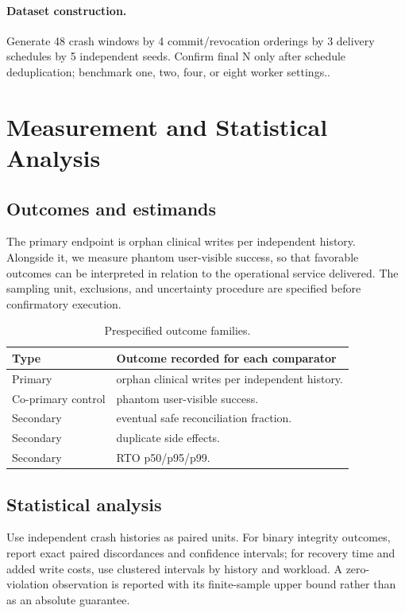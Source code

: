 \documentclass[11pt,a4paper]{article}
\begin{document}
\paragraph{Dataset construction.} Generate 48 crash windows by 4 commit/revocation orderings by 3 delivery schedules by 5 independent seeds. Confirm final N only after schedule deduplication; benchmark one, two, four, or eight worker settings..

\section{Measurement and Statistical Analysis}
\subsection{Outcomes and estimands}
The primary endpoint is orphan clinical writes per independent history. Alongside it, we measure phantom user-visible success, so that favorable outcomes can be interpreted in relation to the operational service delivered. The sampling unit, exclusions, and uncertainty procedure are specified before confirmatory execution.
\begin{table}[ht]
\centering\footnotesize
\caption{Prespecified outcome families.}
\begin{tabularx}{\linewidth}{@{}lX@{}}\toprule
Type & Outcome recorded for each comparator \\ \midrule
Primary & orphan clinical writes per independent history. \\ 
Co-primary control & phantom user-visible success. \\ 
Secondary & eventual safe reconciliation fraction. \\ 
Secondary & duplicate side effects. \\ 
Secondary & RTO p50/p95/p99. \\ 
\bottomrule\end{tabularx}
\end{table}

\subsection{Statistical analysis}
Use independent crash histories as paired units. For binary integrity outcomes, report exact paired discordances and confidence intervals; for recovery time and added write costs, use clustered intervals by history and workload. A zero-violation observation is reported with its finite-sample upper bound rather than as an absolute guarantee.
\end{document}
